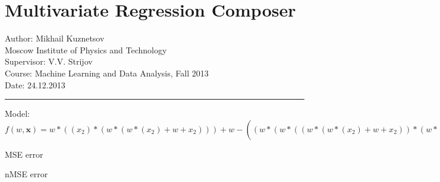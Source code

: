 \documentclass[12pt]{article}
\begin{document}
\section*{Multivariate Regression Composer}
Author: Mikhail Kuznetsov\\
Moscow Institute of Physics and Technology\\
Supervisor: V.V. Strijov\\
Course: Machine Learning and Data Analysis, Fall 2013\\
Date: 24.12.2013\\
\hrule
\vspace{1cm}
Model: $f(w,\mathbf{x})=w*((x_2)*(w*(w*(x_2)+w+x_2)))+w-((w*(w*((w*(w*(x_2)+w+x_2))*(w*(w*(x_2+w+sin(sin(x_2))))))+w))*(w*ew*(x_1)^2+w*(x_1)+wp(((w*(x_1)^2+w*(x_1)+w-w)^2)*w)))$

MSE error

nMSE error
\end{document}
